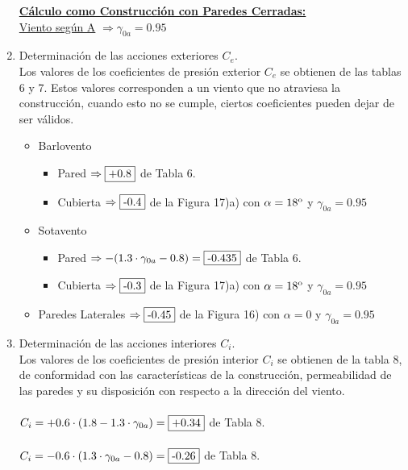 \begin{enumerate}
\textbf{\underline{Cálculo como Construcción con Paredes Cerradas:}}\\
\newline
\underline{Viento según A} $\Rightarrow \gamma_{0a}=0.95$\\

\item Determinación de las acciones exteriores $C_e$.\\
Los valores de los coeficientes de presión exterior $C_e$ se obtienen de las tablas 6 y 7. Estos valores corresponden a un viento que no atraviesa la construcción, cuando esto no se cumple, ciertos coeficientes pueden dejar de ser válidos.\\
\begin{itemize}
	\item Barlovento	
		\begin{itemize}
		\item Pared $\Rightarrow \framebox{+0.8} $ de Tabla 6.
        \item Cubierta $\Rightarrow \framebox{-0.4} $ de la Figura 17)a) con $\alpha = 18\textsuperscript{o}$ y $\gamma_{0a}=0.95$
		\end{itemize}
	\item Sotavento
		\begin{itemize}
		\item Pared $\Rightarrow -(1.3 \cdot \gamma_{0a}-0.8) = \framebox{-0.435}$ de Tabla 6.
        \item Cubierta $\Rightarrow \framebox{-0.3} $ de la Figura 17)a) con $\alpha = 18\textsuperscript{o}$ y $\gamma_{0a}=0.95$
		\end{itemize}
	\item Paredes Laterales $\Rightarrow \framebox{-0.45} $ de la Figura 16) con $\alpha = 0 $ y $\gamma_{0a}=0.95$
\end{itemize}

\item Determinación de las acciones interiores $C_i$.\\
Los valores de los coeficientes de presión interior $C_i$ se obtienen de la tabla 8, de conformidad con las características de la construcción, permeabilidad de las paredes y su disposición con respecto a la dirección del viento.\\
\\
$ C_i = + 0.6 \cdot (1.8 -1.3 \cdot \gamma_{0a}) = \framebox{+0.34} $ de Tabla 8.\\
\\
$ C_i = - 0.6 \cdot (1.3 \cdot \gamma_{0a} - 0.8) = \framebox{-0.26} $ de Tabla 8.\\


\end{enumerate}
